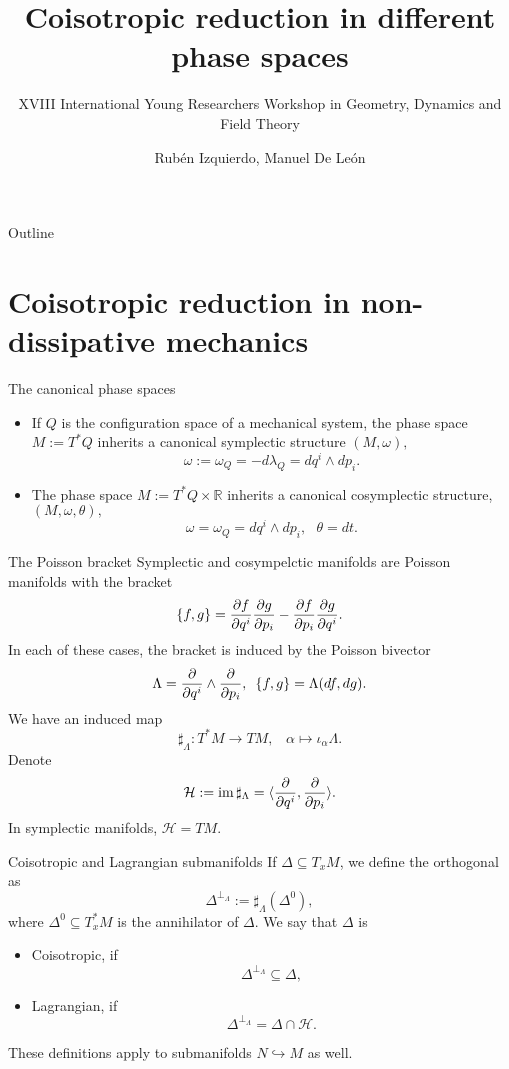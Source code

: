 \documentclass{beamer}
\title{Coisotropic reduction in different phase spaces}
\subtitle{XVIII International Young Researchers Workshop in Geometry, Dynamics and Field Theory}
\author{Rubén Izquierdo, Manuel De León}
\institute{UCM-ICMAT}
\date{\displaydate{date}}
\theoremstyle{definition}
\begin{document}
{
    \vfuzz=16pt %
}

\begin{frame}{Outline}
    \tableofcontents
\end{frame}
\section{Coisotropic reduction in non-dissipative mechanics}
\begin{frame}{The canonical phase spaces}
\begin{itemize}
    \item If $Q$ is the configuration space of a mechanical system, the phase space $M := T^\ast Q$ inherits a canonical \alert<1>{symplectic structure} $(M,\omega),$ $$\omega := \omega_Q = - d \lambda_Q = d q^i \wedge dp_i.$$ \pause
    \item The phase space $M := T^\ast Q \times \mathbb{R}$  inherits a canonical \alert<2>{cosymplectic structure}, $(M, \omega, \theta),$ $$\omega = \omega_Q = d q^i \wedge dp_i, \,\,\,\, \theta = dt.$$ 
\end{itemize}
\end{frame}
\begin{frame}{The Poisson bracket}
    Symplectic and cosympelctic manifolds are \alert<1>{Poisson manifolds} with the bracket $$\{ f , g\} = \pdv{f}{q^i} \pdv{g}{p_i} - \pdv{f}{p_i}\pdv{g}{q^i}.$$\pause In each of these cases, the bracket is induced by the \alert<2>{Poisson bivector} $$\Lambda = \pdv{q^i} \wedge \pdv{p_i}, \,\,\, \{f , g\} = \Lambda(df, dg).$$ \pause
    We have an induced map $$\sharp_\Lambda : T^\ast M \rightarrow TM, \,\,\,\,\, \alpha \mapsto \iota_\alpha \Lambda.$$\pause
    Denote $$\mathcal{H} := \operatorname{im} \sharp_\Lambda = \langle \pdv{q^i}, \pdv{p_i} \rangle.$$ In symplectic manifolds, $\mathcal{H} = TM.$
\end{frame}
\begin{frame}{Coisotropic and Lagrangian submanifolds}
If $\Delta \subseteq T_xM$, we define the \alert<1>{orthogonal} as $$\Delta^{\perp_\Lambda} := \sharp_\Lambda (\Delta ^0),$$ where $\Delta^0 \subseteq T^\ast_x M$ is the annihilator of $\Delta.$ \pause
We say that $\Delta$ is
\begin{itemize}
    \item \alert<2>{Coisotropic}, if $$\Delta^{\perp_\Lambda} \subseteq \Delta,$$ \pause
    \item \alert<3>{Lagrangian}, if $$\Delta^{\perp_\Lambda} = \Delta \cap \mathcal{H}.$$\pause
\end{itemize}
These definitions apply to submanifolds $N \hookrightarrow M$ as well.
\end{frame}
\end{document}
